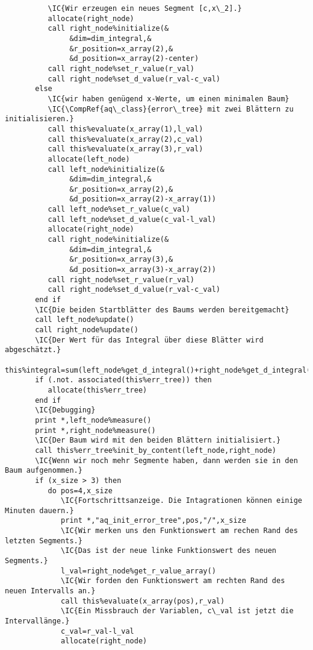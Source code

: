 \begin{Verbatim}
          \IC{Wir erzeugen ein neues Segment [c,x\_2].}
          allocate(right_node)
          call right_node%initialize(&
               &dim=dim_integral,&
               &r_position=x_array(2),&
               &d_position=x_array(2)-center)
          call right_node%set_r_value(r_val)
          call right_node%set_d_value(r_val-c_val)
       else
          \IC{wir haben genügend x-Werte, um einen minimalen Baum}
          \IC{\CompRef{aq\_class}{error\_tree} mit zwei Blättern zu initialisieren.}
          call this%evaluate(x_array(1),l_val)
          call this%evaluate(x_array(2),c_val)
          call this%evaluate(x_array(3),r_val)
          allocate(left_node)
          call left_node%initialize(&
               &dim=dim_integral,&
               &r_position=x_array(2),&
               &d_position=x_array(2)-x_array(1))
          call left_node%set_r_value(c_val)
          call left_node%set_d_value(c_val-l_val)
          allocate(right_node)
          call right_node%initialize(&
               &dim=dim_integral,&
               &r_position=x_array(3),&
               &d_position=x_array(3)-x_array(2))
          call right_node%set_r_value(r_val)
          call right_node%set_d_value(r_val-c_val)
       end if
       \IC{Die beiden Startblätter des Baums werden bereitgemacht}
       call left_node%update()
       call right_node%update()
       \IC{Der Wert für das Integral über diese Blätter wird abgeschätzt.}
       this%integral=sum(left_node%get_d_integral()+right_node%get_d_integral())
       if (.not. associated(this%err_tree)) then
          allocate(this%err_tree)
       end if
       \IC{Debugging}
       print *,left_node%measure()
       print *,right_node%measure()
       \IC{Der Baum wird mit den beiden Blättern initialisiert.}
       call this%err_tree%init_by_content(left_node,right_node)
       \IC{Wenn wir noch mehr Segmente haben, dann werden sie in den Baum aufgenommen.}
       if (x_size > 3) then
          do pos=4,x_size
             \IC{Fortschrittsanzeige. Die Intagrationen können einige Minuten dauern.}
             print *,"aq_init_error_tree",pos,"/",x_size
             \IC{Wir merken uns den Funktionswert am rechen Rand des letzten Segments.}
             \IC{Das ist der neue linke Funktionswert des neuen Segments.}
             l_val=right_node%get_r_value_array()
             \IC{Wir forden den Funktionswert am rechten Rand des neuen Intervalls an.}
             call this%evaluate(x_array(pos),r_val)
             \IC{Ein Missbrauch der Variablen, c\_val ist jetzt die Intervallänge.}
             c_val=r_val-l_val
             allocate(right_node)

\end{Verbatim}
